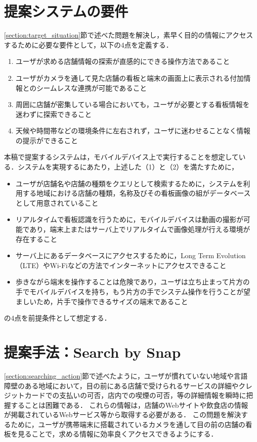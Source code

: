 \section{提案システムの要件}
  \label{subsection:requirement}
  \ref{section:target_situation}節で述べた問題を解決し，素早く目的の情報にアクセスするために必要な要件として，以下の4点を定義する．
  \begin{enumerate}
    \item ユーザが求める店舗情報の探索が直感的にできる操作方法であること
    \item ユーザがカメラを通して見た店舗の看板と端末の画面上に表示される付加情報とのシームレスな連携が可能であること
    \item 周囲に店舗が密集している場合においても，ユーザが必要とする看板情報を迷わずに探索できること
    \item 天候や時間帯などの環境条件に左右されず，ユーザに迷わせることなく情報の提示ができること
  \end{enumerate}
  本稿で提案するシステムは，モバイルデバイス上で実行することを想定している．システムを実現するにあたり，上述した（1）と（2）を満たすために，
  \begin{itemize}
    \item ユーザが店舗名や店舗の種類をクエリとして検索するために，システムを利用する地域における店舗の種類，名称及びその看板画像の組がデータベースとして用意されていること
    \item リアルタイムで看板認識を行うために，モバイルデバイスは動画の撮影が可能であり，端末上またはサーバ上でリアルタイムで画像処理が行える環境が存在すること
    \item サーバ上にあるデータベースにアクセスするために，Long Term Evolution（LTE）やWi-Fiなどの方法でインターネットにアクセスできること
    \item 歩きながら端末を操作することは危険であり，ユーザは立ち止まって片方の手でモバイルデバイスを持ち，もう片方の手でシステム操作を行うことが望ましいため，片手で操作できるサイズの端末であること
  \end{itemize}
  の4点を前提条件として想定する．

\section{提案手法：Search by Snap}
\label{section:design_sbs}
  \ref{section:searching_action}節で述べたように，ユーザが慣れていない地域や言語障壁のある地域において，目の前にある店舗で受けられるサービスの詳細やクレジットカードでの支払いの可否，店内での喫煙の可否，等の詳細情報を瞬時に把握することは困難である．
  これらの情報は，店舗のWebサイトや飲食店の情報が掲載されているWebサービス等から取得する必要がある．
  この問題を解決するために，ユーザが携帯端末に搭載されているカメラを通して目の前の店舗の看板を見ることで，求める情報に効率良くアクセスできるようにする．
  
